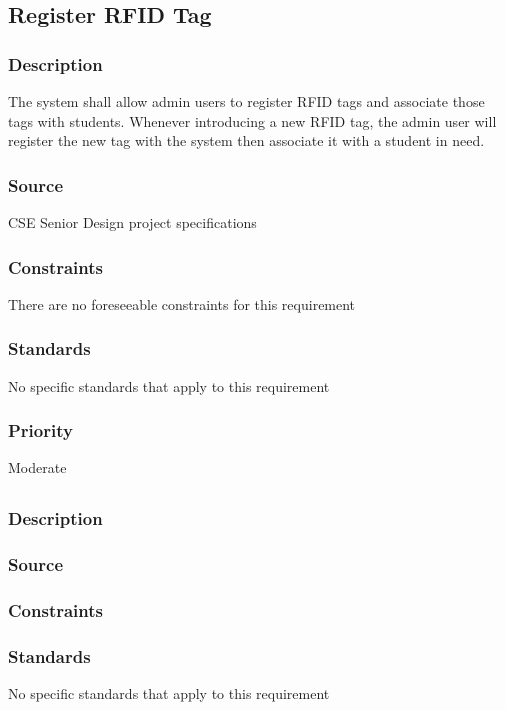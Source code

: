 \subsection{Register RFID Tag}
\subsubsection{Description}
The system shall allow admin users to register RFID tags and associate those tags 
with students. Whenever introducing a new RFID tag, the admin user will register the 
new tag with the system then associate it with a student in need.
\subsubsection{Source}
CSE Senior Design project specifications
\subsubsection{Constraints}
There are no foreseeable constraints for this requirement  
\subsubsection{Standards}
No specific standards that apply to this requirement
\subsubsection{Priority}
Moderate

\subsection{}
\subsubsection{Description}

\subsubsection{Source}

\subsubsection{Constraints}

\subsubsection{Standards}
No specific standards that apply to this requirement
